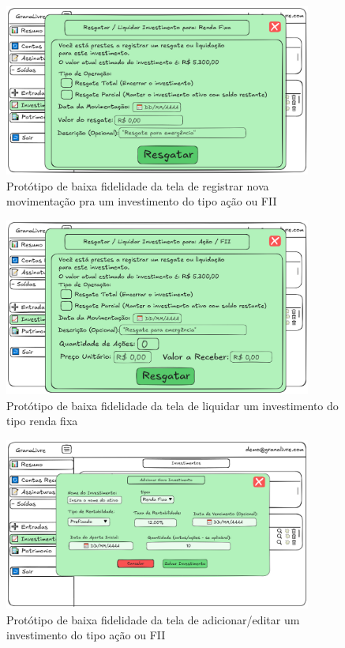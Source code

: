 \begin{figure}[H]
    \centering
    \includegraphics[width=0.9\textwidth]{imgs/08-investimentos5.png}
    \caption{Protótipo de baixa fidelidade da tela de registrar nova movimentação pra um investimento do tipo ação ou FII}
    \label{fig:prot_investimentos5}
\end{figure}

\begin{figure}[H]
    \centering
    \includegraphics[width=0.9\textwidth]{imgs/08-investimentos6.png}
    \caption{Protótipo de baixa fidelidade da tela de liquidar um investimento do tipo renda fixa}
    \label{fig:prot_investimentos6}
\end{figure}

\begin{figure}[H]
    \centering
    \includegraphics[width=0.9\textwidth]{imgs/08-investimentos7.png}
    \caption{Protótipo de baixa fidelidade da tela de adicionar/editar um investimento do tipo ação ou FII}
    \label{fig:prot_investimentos7}
\end{figure}

